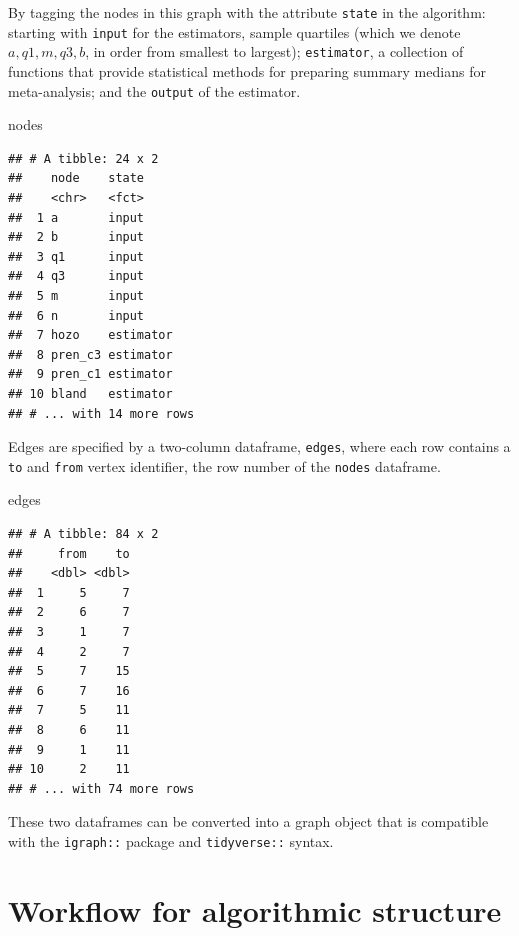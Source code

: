 \documentclass[
]{article}
\newenvironment{Shaded}{\begin{snugshade}}{\end{snugshade}}
\newcommand{\NormalTok}[1]{#1}
\begin{document}
By tagging the nodes in this graph with the attribute \texttt{state} in the algorithm: starting with \texttt{input} for the estimators, sample quartiles (which we denote \(a, q1, m, q3, b\), in order from smallest to largest); \texttt{estimator}, a collection of functions that provide statistical methods for preparing summary medians for meta-analysis; and the \texttt{output} of the estimator.

\begin{Shaded}
\begin{Highlighting}[]
\NormalTok{nodes}
\end{Highlighting}
\end{Shaded}

\begin{verbatim}
## # A tibble: 24 x 2
##    node    state    
##    <chr>   <fct>    
##  1 a       input    
##  2 b       input    
##  3 q1      input    
##  4 q3      input    
##  5 m       input    
##  6 n       input    
##  7 hozo    estimator
##  8 pren_c3 estimator
##  9 pren_c1 estimator
## 10 bland   estimator
## # ... with 14 more rows
\end{verbatim}

Edges are specified by a two-column dataframe, \texttt{edges}, where each row contains a \texttt{to} and \texttt{from} vertex identifier, the row number of the \texttt{nodes} dataframe.

\begin{Shaded}
\begin{Highlighting}[]
\NormalTok{edges}
\end{Highlighting}
\end{Shaded}

\begin{verbatim}
## # A tibble: 84 x 2
##     from    to
##    <dbl> <dbl>
##  1     5     7
##  2     6     7
##  3     1     7
##  4     2     7
##  5     7    15
##  6     7    16
##  7     5    11
##  8     6    11
##  9     1    11
## 10     2    11
## # ... with 74 more rows
\end{verbatim}

These two dataframes can be converted into a graph object that is compatible with the \texttt{igraph::} package and \texttt{tidyverse::} syntax.

\hypertarget{workflow-for-algorithmic-structure}{%
\section{Workflow for algorithmic structure}\label{workflow-for-algorithmic-structure}}
\end{document}
